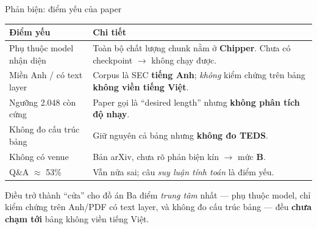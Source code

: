 \documentclass[aspectratio=169,11pt]{beamer}
\begin{document}
\begin{frame}{Phản biện: điểm yếu của paper}
  \centering\footnotesize
  \begin{tabular}{@{}p{} p{}@{}}
    \toprule
    \textbf{Điểm yếu} & \textbf{Chi tiết} \\
    \midrule
    Phụ thuộc model nhận diện & Toàn bộ chất lượng chunk nằm ở \textbf{Chipper}. Chưa có checkpoint $\rightarrow$ không chạy được. \\
    Miền Anh / có text layer & Corpus là SEC \textbf{tiếng Anh}; \emph{không} kiểm chứng trên bảng \textbf{không viền tiếng Việt}. \\
    Ngưỡng 2.048 còn cứng & Paper gọi là ``desired length'' nhưng \textbf{không phân tích độ nhạy}. \\
    Không đo cấu trúc bảng & Giữ nguyên cả bảng nhưng \textbf{không đo TEDS}. \\
    Không có venue & Bản arXiv, chưa rõ phản biện kín $\rightarrow$ mức \textbf{B}. \\
    Q\&A $\approx$ 53\% & Vẫn nửa sai; câu \emph{suy luận tính toán} là điểm yếu. \\
    \bottomrule
  \end{tabular}
  \vspace{0.3em}
  \begin{alertblock}{\small Điều trở thành ``cửa'' cho đồ án}
    Ba điểm \emph{trung tâm} nhất — phụ thuộc model, chỉ kiểm chứng trên Anh/PDF
    có text layer, và không đo cấu trúc bảng — đều \textbf{chưa chạm tới} bảng
    không viền tiếng Việt.
  \end{alertblock}
\end{frame}
\end{document}
